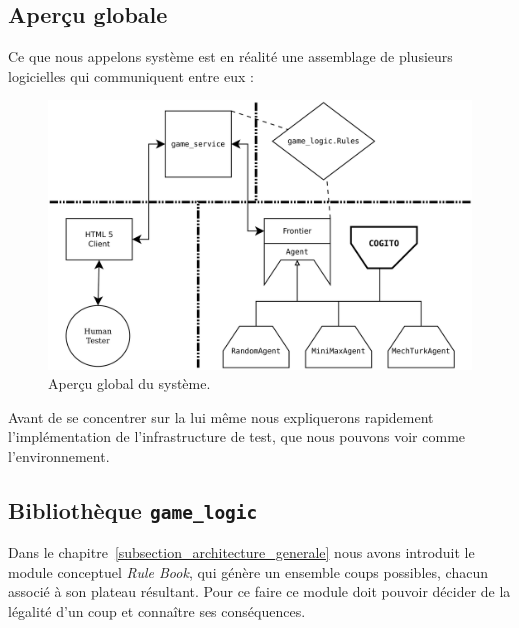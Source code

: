 \subsection{Aperçu globale}

Ce que nous appelons système est en réalité une assemblage de plusieurs logicielles qui communiquent entre eux :

\begin{figure}[H] 
\centering
\includegraphics[width=\textwidth]{files/william/archi_full} 
\caption{Aperçu global du système.} 
\end{figure}

Avant de se concentrer sur la \cogito{} lui même nous expliquerons rapidement l'implémentation de l'infrastructure de test, que nous pouvons voir comme l'environnement.

\subsection{Bibliothèque \texttt{\gls{game_logic}}}

Dans le chapitre~\ref{subsection_architecture_generale} nous avons introduit le module conceptuel \emph{Rule Book}, qui génère un ensemble coups possibles, chacun associé à son plateau résultant. Pour ce faire ce module doit pouvoir décider de la légalité d'un coup et connaître ses conséquences. 

